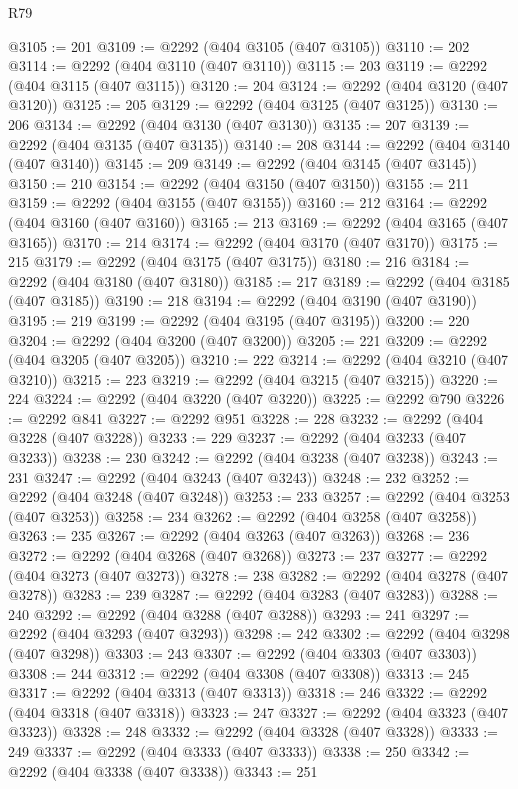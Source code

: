 \begin{lexlean}{R79}
\begin{coremodule}
@3105 := 201
@3109 := @2292 (@404 @3105 (@407 @3105))
@3110 := 202
@3114 := @2292 (@404 @3110 (@407 @3110))
@3115 := 203
@3119 := @2292 (@404 @3115 (@407 @3115))
@3120 := 204
@3124 := @2292 (@404 @3120 (@407 @3120))
@3125 := 205
@3129 := @2292 (@404 @3125 (@407 @3125))
@3130 := 206
@3134 := @2292 (@404 @3130 (@407 @3130))
@3135 := 207
@3139 := @2292 (@404 @3135 (@407 @3135))
@3140 := 208
@3144 := @2292 (@404 @3140 (@407 @3140))
@3145 := 209
@3149 := @2292 (@404 @3145 (@407 @3145))
@3150 := 210
@3154 := @2292 (@404 @3150 (@407 @3150))
@3155 := 211
@3159 := @2292 (@404 @3155 (@407 @3155))
@3160 := 212
@3164 := @2292 (@404 @3160 (@407 @3160))
@3165 := 213
@3169 := @2292 (@404 @3165 (@407 @3165))
@3170 := 214
@3174 := @2292 (@404 @3170 (@407 @3170))
@3175 := 215
@3179 := @2292 (@404 @3175 (@407 @3175))
@3180 := 216
@3184 := @2292 (@404 @3180 (@407 @3180))
@3185 := 217
@3189 := @2292 (@404 @3185 (@407 @3185))
@3190 := 218
@3194 := @2292 (@404 @3190 (@407 @3190))
@3195 := 219
@3199 := @2292 (@404 @3195 (@407 @3195))
@3200 := 220
@3204 := @2292 (@404 @3200 (@407 @3200))
@3205 := 221
@3209 := @2292 (@404 @3205 (@407 @3205))
@3210 := 222
@3214 := @2292 (@404 @3210 (@407 @3210))
@3215 := 223
@3219 := @2292 (@404 @3215 (@407 @3215))
@3220 := 224
@3224 := @2292 (@404 @3220 (@407 @3220))
@3225 := @2292 @790
@3226 := @2292 @841
@3227 := @2292 @951
@3228 := 228
@3232 := @2292 (@404 @3228 (@407 @3228))
@3233 := 229
@3237 := @2292 (@404 @3233 (@407 @3233))
@3238 := 230
@3242 := @2292 (@404 @3238 (@407 @3238))
@3243 := 231
@3247 := @2292 (@404 @3243 (@407 @3243))
@3248 := 232
@3252 := @2292 (@404 @3248 (@407 @3248))
@3253 := 233
@3257 := @2292 (@404 @3253 (@407 @3253))
@3258 := 234
@3262 := @2292 (@404 @3258 (@407 @3258))
@3263 := 235
@3267 := @2292 (@404 @3263 (@407 @3263))
@3268 := 236
@3272 := @2292 (@404 @3268 (@407 @3268))
@3273 := 237
@3277 := @2292 (@404 @3273 (@407 @3273))
@3278 := 238
@3282 := @2292 (@404 @3278 (@407 @3278))
@3283 := 239
@3287 := @2292 (@404 @3283 (@407 @3283))
@3288 := 240
@3292 := @2292 (@404 @3288 (@407 @3288))
@3293 := 241
@3297 := @2292 (@404 @3293 (@407 @3293))
@3298 := 242
@3302 := @2292 (@404 @3298 (@407 @3298))
@3303 := 243
@3307 := @2292 (@404 @3303 (@407 @3303))
@3308 := 244
@3312 := @2292 (@404 @3308 (@407 @3308))
@3313 := 245
@3317 := @2292 (@404 @3313 (@407 @3313))
@3318 := 246
@3322 := @2292 (@404 @3318 (@407 @3318))
@3323 := 247
@3327 := @2292 (@404 @3323 (@407 @3323))
@3328 := 248
@3332 := @2292 (@404 @3328 (@407 @3328))
@3333 := 249
@3337 := @2292 (@404 @3333 (@407 @3333))
@3338 := 250
@3342 := @2292 (@404 @3338 (@407 @3338))
@3343 := 251

\end{coremodule}
\end{lexlean}
